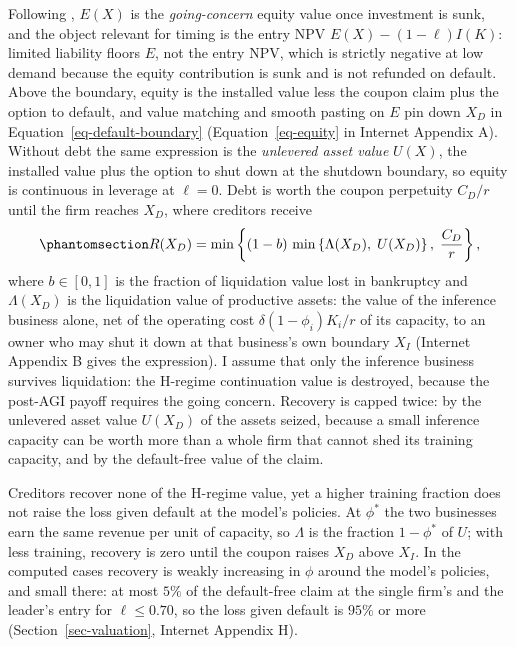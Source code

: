 \documentclass[
  11pt,
  letterpaper,
]{scrartcl}
\newcounter{none} %
\begin{document}
Following \citet{leland1994corporate}, \(E(X)\) is the
\emph{going-concern} equity value once investment is sunk, and the
object relevant for timing is the entry NPV \(E(X) - (1-\ell)I(K)\):
limited liability floors \(E\), not the entry NPV, which is strictly
negative at low demand because the equity contribution is sunk and is
not refunded on default. Above the boundary, equity is the installed
value less the coupon claim plus the option to default, and value
matching and smooth pasting on \(E\) pin down \(X_D\) in
Equation~\ref{eq-default-boundary} (Equation~\ref{eq-equity} in Internet
Appendix A). Without debt the same expression is the \emph{unlevered
asset value} \(U(X)\), the installed value plus the option to shut down
at the shutdown boundary, so equity is continuous in leverage at
\(\ell = 0\). Debt is worth the coupon perpetuity \(C_D/r\) until the
firm reaches \(X_D\), where creditors receive
\begin{equation}\protect\phantomsection\label{eq-recovery}{
R(X_D) = \min\left\{(1 - b)\,\min\left\{\Lambda(X_D),\; U(X_D)\right\},\; \frac{C_D}{r}\right\},
}\end{equation} where \(b \in [0,1]\) is the fraction of liquidation
value lost in bankruptcy and \(\Lambda(X_D)\) is the liquidation value
of productive assets: the value of the inference business alone, net of
the operating cost \(\delta(1-\phi_i)K_i/r\) of its capacity, to an
owner who may shut it down at that business's own boundary \(X_I\)
(Internet Appendix B gives the expression). I assume that only the
inference business survives liquidation: the H-regime continuation value
is destroyed, because the post-AGI payoff requires the going concern.
Recovery is capped twice: by the unlevered asset value \(U(X_D)\) of the
assets seized, because a small inference capacity can be worth more than
a whole firm that cannot shed its training capacity, and by the
default-free value of the claim.

Creditors recover none of the H-regime value, yet a higher training
fraction does not raise the loss given default at the model's policies.
At \(\phi^*\) the two businesses earn the same revenue per unit of
capacity, so \(\Lambda\) is the fraction \(1 - \phi^*\) of \(U\); with
less training, recovery is zero until the coupon raises \(X_D\) above
\(X_I\). In the computed cases recovery is weakly increasing in \(\phi\)
around the model's policies, and small there: at most \(5\%\) of the
default-free claim at the single firm's and the leader's entry for
\(\ell \leq 0.70\), so the loss given default is \(95\%\) or more
(Section~\ref{sec-valuation}, Internet Appendix H).
\end{document}
